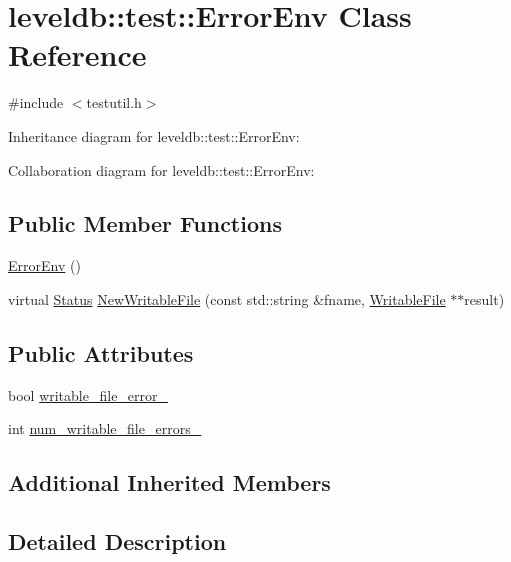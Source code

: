 \hypertarget{classleveldb_1_1test_1_1_error_env}{}\section{leveldb\+:\+:test\+:\+:Error\+Env Class Reference}
\label{classleveldb_1_1test_1_1_error_env}


{\ttfamily \#include $<$testutil.\+h$>$}



Inheritance diagram for leveldb\+:\+:test\+:\+:Error\+Env\+:


Collaboration diagram for leveldb\+:\+:test\+:\+:Error\+Env\+:
\subsection*{Public Member Functions}
\begin{DoxyCompactItemize}
\item 
\hyperlink{classleveldb_1_1test_1_1_error_env_aa9d0985b519b252aec24cca8fe89c8b7}{Error\+Env} ()
\item 
virtual \hyperlink{classleveldb_1_1_status}{Status} \hyperlink{classleveldb_1_1test_1_1_error_env_a2990be71c7fb9473bd1fa0f8da8fd078}{New\+Writable\+File} (const std\+::string \&fname, \hyperlink{classleveldb_1_1_writable_file}{Writable\+File} $\ast$$\ast$result)
\end{DoxyCompactItemize}
\subsection*{Public Attributes}
\begin{DoxyCompactItemize}
\item 
bool \hyperlink{classleveldb_1_1test_1_1_error_env_ae3593b752dff671f24f3637376e1cf22}{writable\+\_\+file\+\_\+error\+\_\+}
\item 
int \hyperlink{classleveldb_1_1test_1_1_error_env_afa4564355d86107c8ed0d6efe53eadef}{num\+\_\+writable\+\_\+file\+\_\+errors\+\_\+}
\end{DoxyCompactItemize}
\subsection*{Additional Inherited Members}


\subsection{Detailed Description}


